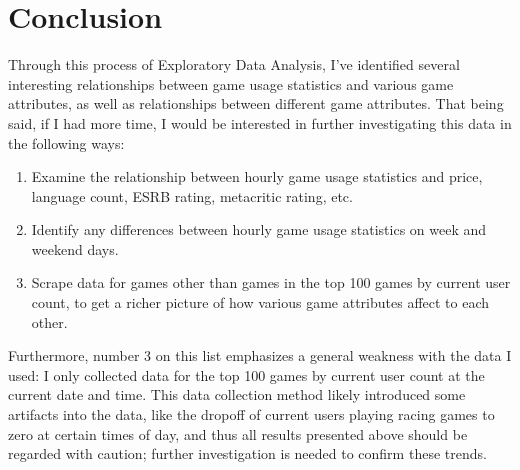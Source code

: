 \documentclass[pdftex,12pt,a4paper]{article}
\begin{document}
\section{Conclusion}
Through this process of Exploratory Data Analysis, I've identified several interesting relationships between game usage statistics and various game attributes, as well as relationships between different game attributes. That being said, if I had more time, I would be interested in further investigating this data in the following ways:
\begin{enumerate}
\item Examine the relationship between hourly game usage statistics and price, language count, ESRB rating, metacritic rating, etc.
\item Identify any differences between hourly game usage statistics on week and weekend days.
\item Scrape data for games other than games in the top 100 games by current user count, to get a richer picture of how various game attributes affect to each other.
\end{enumerate}
Furthermore, number 3 on this list emphasizes a general weakness with the data I used: I only collected data for the top 100 games by current user count at the current date and time. This data collection method likely introduced some artifacts into the data, like the dropoff of current users playing racing games to zero at certain times of day, and thus all results presented above should be regarded with caution; further investigation is needed to confirm these trends. 
\end{document}
